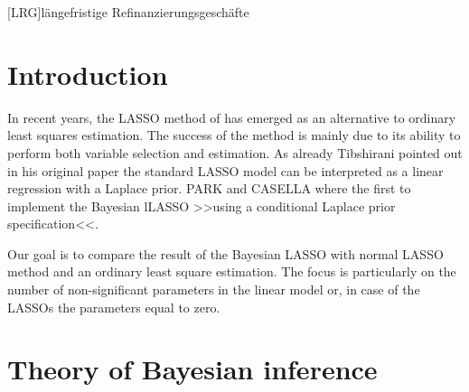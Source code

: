 \documentclass[12pt,a4paper]{article}
\begin{document}
\begin{adjustwidth}{1.5em}{0pt}

\begin{acronym}[dummyyyy]
 [LRG]{längefristige Refinanzierungsgeschäfte}

\end{acronym}

\end{adjustwidth}

\restoregeometry

\newpage
{}
\hypertarget{introduction}{%
\section{Introduction}\label{introduction}}

In recent years, the \ac{LASSO} method of
\textcite{tibshirani_regression_1996} has emerged as an alternative to
ordinary least squares estimation. The success of the method is mainly
due to its ability to perform both variable selection and estimation. As
already Tibshirani pointed out in his original paper the standard
\ac{LASSO} model can be interpreted as a linear regression with a
Laplace prior. PARK and CASELLA where the first to implement the
Bayesian l\ac{LASSO} \textgreater\textgreater using a conditional
Laplace prior specification\textless\textless.

Our goal is to compare the result of the Bayesian \ac{LASSO} with normal
\ac{LASSO} method and an ordinary least square estimation. The focus is
particularly on the number of non-significant parameters in the linear
model or, in case of the \acp{LASSO} the parameters equal to zero.

\newpage

\hypertarget{theory-of-bayesian-inference}{%
\section{Theory of Bayesian
inference}\label{theory-of-bayesian-inference}}
\end{document}
